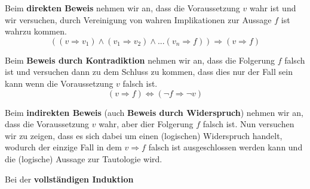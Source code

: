 \documentclass[../../main.tex]{subfiles}
\begin{document}
	\begin{definition}
		Beim \textbf{direkten Beweis} nehmen wir an, dass die Voraussetzung $v$ wahr ist und wir versuchen, durch Vereinigung von wahren Implikationen zur Aussage \dq$f$ ist wahr\dq zu kommen.
		$$((v \Rightarrow v_1) \land (v_1 \Rightarrow v_2) \land ... (v_n \Rightarrow f)) \Rightarrow (v \Rightarrow f)$$
	\end{definition}

	\begin{definition}
		Beim \textbf{Beweis durch Kontradiktion} nehmen wir an, dass die Folgerung $f$ falsch ist und versuchen dann zu dem Schluss zu kommen, dass dies nur der Fall sein kann wenn die Voraussetzung $v$ falsch ist. 
		$$(v \Rightarrow f) \Leftrightarrow (\lnot f \Rightarrow \lnot v)$$
	\end{definition}

	\begin{definition}
		Beim \textbf{indirekten Beweis} (auch \textbf{Beweis durch Widerspruch}) nehmen wir an, dass die Voraussetzung $v$ wahr, aber dier Folgerung $f$ falsch ist. Nun versuchen wir zu zeigen, dass es sich dabei um einen (logischen) Widerspruch handelt, wodurch der einzige Fall in dem $v \Rightarrow f$ falsch ist ausgeschlossen werden kann und die (logische) Aussage zur Tautologie wird.
	\end{definition}

	\begin{definition}
		Bei der \textbf{vollständigen Induktion}
	\end{definition}
\end{document}
